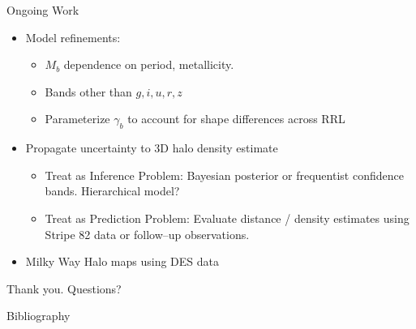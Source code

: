 \documentclass[12pt]{beamer}
\begin{document}
\begin{frame}{Ongoing Work}
\begin{itemize}
\item Model refinements:
\begin{itemize}
\item $M_b$ dependence on period, metallicity.
\item Bands other than $g,i,u,r,z$
\item Parameterize $\gamma_b$ to account for shape differences across RRL
\end{itemize}
\item Propagate uncertainty to 3D halo density estimate
\begin{itemize}
\item Treat as Inference Problem: Bayesian posterior or frequentist confidence bands. Hierarchical model?
\item Treat as Prediction Problem: Evaluate distance / density estimates using Stripe 82 data or follow--up observations.
\end{itemize}
\item Milky Way Halo maps using DES data
\end{itemize}
\end{frame}





\begin{frame}

  \begin{center}
    {\huge Thank you. Questions?}
    \end{center}

\end{frame}



\begin{frame}[allowframebreaks]{Bibliography}
 
  \tiny{
  }
\end{frame}
\end{document}
